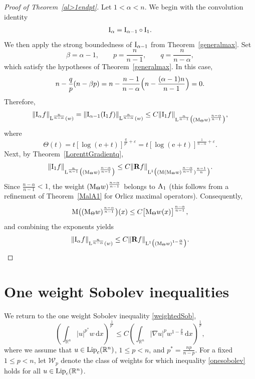 \documentclass[11pt, a4paper, reqno]{amsart}
\newcommand{\R}{\mathbb R}
\newcommand{\A}{\textup A}
\newcommand{\dx}{\,{\mathrm dx}}
\newcommand{\Lup}{\textup{L}}
\DeclareMathOperator{\Lip}{\textup{Lip}}
\theoremstyle{definition}
\theoremstyle{remark}
\begin{document}
\begin{proof}[Proof of Theorem~\ref{al>1endpt}]
Let $1<\alpha<n$. We begin with the convolution identity
\[
\textup I_\alpha=\textup I_{\alpha-1}\circ \textup I_1.
\]
We then apply the strong boundedness of $\textup I_{\alpha-1}$ from Theorem~\ref{generalmax}. Set
\[
\beta=\alpha-1, \qquad p=\frac{n}{n-1}, \qquad q=\frac{n}{n-\alpha},
\]
which satisfy the hypotheses of Theorem~\ref{generalmax}. In this case,
\[
n-\frac{q}{p}(n-\beta p)
= n-\frac{n-1}{n-\alpha}\Bigl(n-\frac{(\alpha-1)n}{n-1}\Bigr)
=0.
\]
Therefore,
\[
\|\textup I_\alpha f\|_{\Lup^{\frac{n}{n-\alpha}}(w)}
= \|\textup I_{\alpha-1}(\textup I_1 f)\|_{\Lup^{\frac{n}{n-\alpha}}(w)}
\le C \|\textup I_1 f\|_{\Lup^{\frac{n}{n-1}}\big((\textup M_{\Theta}w)^{\frac{n-\alpha}{n-1}}\big)},
\]
where
\[
\Theta(t)=t[\log(\mathrm e+t)]^{\frac{q}{p'}+\varepsilon}
= t[\log(\mathrm e+t)]^{\frac{1}{n-\alpha}+\varepsilon}.
\]
Next, by Theorem~\ref{LorenttGradientq},
\[
\|\textup I_1 f\|_{\Lup^{\frac{n}{n-1}}\big((\textup M_{\Theta}w)^{\frac{n-\alpha}{n-1}}\big)}
\le C \|\mathbf R f\|_{\Lup^1\big((\textup M(\textup M_{\Theta}w)^{\frac{n-\alpha}{n-1}})^{\frac{n-1}{n}}\big)}.
\]
Since $\frac{n-\alpha}{n-1}<1$, the weight $(\textup M_{\Theta}w)^{\frac{n-\alpha}{n-1}}$ belongs to $\A_1$ (this follows from a refinement of Theorem~\ref{MalA1} for Orlicz maximal operators). Consequently,
\[
\textup M\big((\textup M_{\Theta}w)^{\frac{n-\alpha}{n-1}}\big)(x)
\le C \big[\textup M_{\Theta}w(x)\big]^{\frac{n-\alpha}{n-1}},
\]
and combining the exponents yields
\[
\|\textup I_\alpha f\|_{\Lup^{\frac{n}{n-\alpha}}(w)}
\le C \|\mathbf R f\|_{\Lup^1\big((\textup M_{\Theta}w)^{1-\frac{\alpha}{n}}\big)}.
\]

\end{proof} 

\section{One weight Sobolev inequalities}\label{oneweight}

We return to the one weight Sobolev inequality \eqref{weightedSob},
\begin{equation}\label{onesobolev}
\left(\int_{\R^n} |u|^{p^*} w\dx\right)^{\frac1{p^*}}
\leq C\left(\int_{\R^n}|\nabla u|^p w^{1-\frac{p}{n}}\dx\right)^\frac1p,
\end{equation}
where we assume that $u\in \Lip_c(\R^n)$, $1\leq p<n$, and $p^*=\frac{np}{n-p}$. For a fixed $1\leq p<n$, let $\mathcal W_p$ denote the class of weights for which inequality \eqref{onesobolev} holds for all $u\in \Lip_c(\R^n)$.
\end{document}
